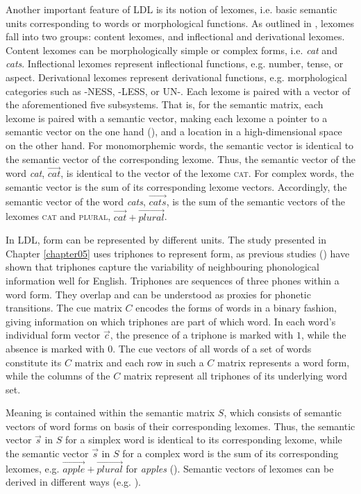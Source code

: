 Another important feature of LDL is its notion of lexomes, i.e. basic semantic units corresponding to words or morphological functions. As outlined in \cite{Chuang2021}, lexomes fall into two groups: content lexomes, and inflectional and derivational lexomes. Content lexomes can be morphologically simple or complex forms, i.e. \textit{cat} and \textit{cats}. Inflectional lexomes represent inflectional functions, e.g. number, tense, or aspect. Derivational lexomes represent derivational functions, e.g. morphological categories such as -NESS, -LESS, or UN-. Each lexome is paired with a vector of the aforementioned five subsystems. That is, for the semantic matrix, each lexome is paired with a semantic vector, making each lexome a pointer to a semantic vector on the one hand (\cite{Milin2017Feldman}), and a location in a high-dimensional space on the other hand. For monomorphemic words, the semantic vector is identical to the semantic vector of the corresponding lexome. Thus, the semantic vector of the word \textit{cat}, $\overrightarrow{cat}$, is identical to the vector of the lexome \textsc{cat}. For complex words, the semantic vector is the sum of its corresponding lexome vectors. Accordingly, the semantic vector of the word \textit{cats}, $\overrightarrow{cats}$, is the sum of the semantic vectors of the lexomes \textsc{cat} and \textsc{plural}, $\overrightarrow{cat} +\overrightarrow{plural}$. 

In LDL, form can be represented by different units. The study presented in Chapter \ref{chapter05} uses triphones to represent form, as previous studies (\cite{Milin2017Feldman, Baayen2019, Chuang2020}) have shown that triphones capture the variability of neighbouring phonological information well for English. Triphones are sequences of three phones within a word form. They overlap and can be understood as proxies for phonetic transitions. The cue matrix $C$ encodes the forms of words in a binary fashion, giving information on which triphones are part of which word. In each word’s individual form vector $\overrightarrow{c}$, the presence of a triphone is marked with $1$, while the absence is marked with $0$. The cue vectors of all words of a set of words constitute its $C$ matrix and each row in such a $C$ matrix represents a word form, while the columns of the $C$ matrix represent all triphones of its underlying word set.

Meaning is contained within the semantic matrix $S$, which consists of semantic vectors of word forms on basis of their corresponding lexomes. Thus, the semantic vector $\overrightarrow{s}$ in $S$ for a simplex word is identical to its corresponding lexome, while the semantic vector $\overrightarrow{s}$ in $S$ for a complex word is the sum of its corresponding lexomes, e.g. $\overrightarrow{apple}+\overrightarrow{plural}$ for \textit{apples} (\cite{Baayen2019}). Semantic vectors of lexomes can be derived in different ways (e.g. \cite{Landauer1997, Jones2007, Shaoul2010, Mikolov2013}).

